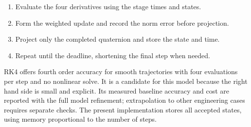 \begin{enumerate}
\item Evaluate the four derivatives using the stage times and states.
\item Form the weighted update and record the norm error before projection.
\item Project only the completed quaternion and store the state and time.
\item Repeat until the deadline, shortening the final step when needed.
\end{enumerate}
RK4 offers fourth order accuracy for smooth trajectories with four evaluations
per step and no nonlinear solve. It is a candidate for this model because the
right hand side is small and explicit. Its measured baseline accuracy and cost are reported with the full model refinement; extrapolation to other engineering cases requires separate checks. The present implementation stores
all accepted states, using memory proportional to the number of steps.
